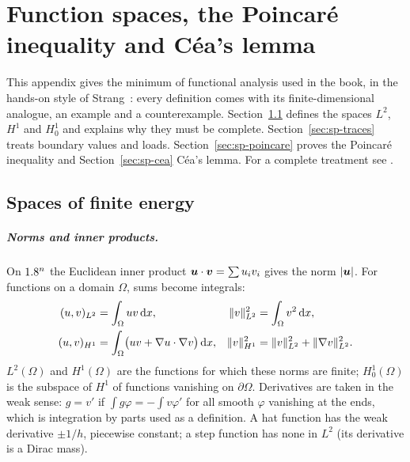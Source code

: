 \chapter{Function spaces, the Poincar\'e inequality and C\'ea's lemma}\label{app:spaces}

This appendix gives the minimum of functional analysis used in the book, in
the hands-on style of Strang~\cite{StrangFix1973,StrangCSE2007}: every
definition comes with its finite-dimensional analogue, an example and a
counterexample. Section~\ref{sec:sp-spaces} defines the spaces $L^2$, $H^1$
and $H^1_0$ and explains why they must be complete.
Section~\ref{sec:sp-traces} treats boundary values and loads.
Section~\ref{sec:sp-poincare} proves the Poincar\'e inequality and
Section~\ref{sec:sp-cea} C\'ea's lemma. For a complete treatment see
\cite{BrezisSp,EvansSp,AdamsSp}.

\section{Spaces of finite energy}\label{sec:sp-spaces}
%
\paragraph{Norms and inner products.} On $1.8^n$ the Euclidean inner product
$\bm{u}\cdot\bm{v}=\sum u_iv_i$ gives the norm $|\bm{u}|$. For functions on a domain
$\Omega$, sums become integrals:
\begin{align*}
  (u,v)_{L^2}&=\int_\Omega uv\,\mathrm{d} x, &
  \lVert v\rVert_{L^2}^2&=\int_\Omega v^2\,\mathrm{d} x,\\
  (u,v)_{H^1}&=\int_\Omega\bigl(uv+\nabla u\cdot\nabla v\bigr)\,\mathrm{d} x, &
  \lVert v\rVert_{H^1}^2&=\lVert v\rVert_{L^2}^2+\lVert \nabla v\rVert_{L^2}^2 .
\end{align*}
$L^2(\Omega)$ and $H^1(\Omega)$ are the functions for which these norms are
finite; $H^1_0(\Omega)$ is the subspace of $H^1$ of functions vanishing on
$\partial\Omega$. Derivatives are taken in the weak sense: $g=v'$ if
$\displaystyle \int g\varphi=-\int v\varphi'$ for all smooth $\varphi$ vanishing at the ends,
which is integration by parts used as a definition. A hat function has the
weak derivative $\pm1/h$, piecewise constant; a step function has none in
$L^2$ (its derivative is a Dirac mass).

